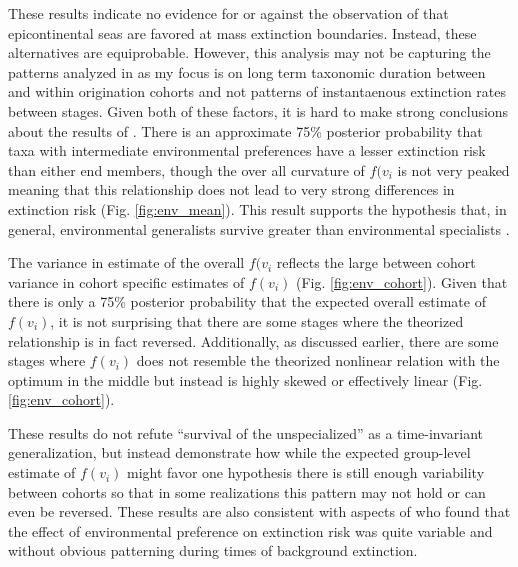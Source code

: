 \documentclass[12pt,letterpaper]{article}
\begin{document}
These results indicate no evidence for or against the observation of \citet{Miller2009a} that epicontinental seas are favored at mass extinction boundaries. Instead, these alternatives are equiprobable. However, this analysis may not be capturing the patterns analyzed in \citet{Miller2009a} as my focus is on long term taxonomic duration between and within origination cohorts and not patterns of instantaenous extinction rates between stages. Given both of these factors, it is hard to make strong conclusions about the results of \citet{Miller2009a}.  
There is an approximate 75\% posterior probability that taxa with intermediate environmental preferences have a lesser extinction risk than either end members, though the over all curvature of \(f(v_{i}\) is not very peaked meaning that this relationship does not lead to very strong differences in extinction risk (Fig. \ref{fig:env_mean}). This result supports the hypothesis that, in general, environmental generalists survive greater than environmental specialists \citep{Simpson1944,Liow2004a,Liow2007b,Nurnberg2013a,Nurnberg2015}.

The variance in estimate of the overall \(f(v_{i}\) reflects the large between cohort variance in cohort specific estimates of \(f(v_{i})\) (Fig. \ref{fig:env_cohort}). Given that there is only a 75\% posterior probability that the expected overall estimate of \(f(v_{i})\), it is not surprising that there are some stages where the theorized relationship is in fact reversed. Additionally, as discussed earlier, there are some stages where \(f(v_{i})\) does not resemble the theorized nonlinear relation with the optimum in the middle but instead is highly skewed or effectively linear (Fig. \ref{fig:env_cohort}). 

These results do not refute ``survival of the unspecialized'' as a time-invariant generalization, but instead demonstrate how while the expected group-level estimate of \(f(v_{i})\) might favor one hypothesis there is still enough variability between cohorts so that in some realizations this pattern may not hold or can even be reversed. These results are also consistent with aspects of \citep{Miller2009a} who found that the effect of environmental preference on extinction risk was quite variable and without obvious patterning during times of background extinction.

\end{document}
